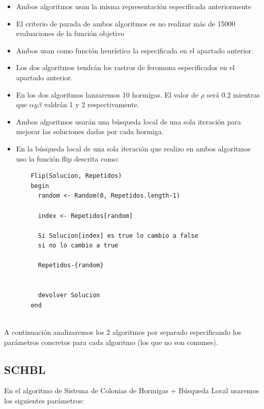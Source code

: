 \begin{itemize}
	\item Ambos algoritmos usan la misma representación especificada anteriormente

	\item El criterio de parada de ambos algoritmos es no realizar más de 15000 evaluaciones de la función objetivo
	
	\item Ambos usan como función heurística la especificada en el apartado anterior.
	
	\item Los dos algoritmos tendrán los rastros de feromona especificados en el apartado anterior.
	
	\item En los dos algoritmos lanzaremos 10 hormigas. El valor de $\rho$ será 0.2 mientras que $\alpha y \beta$ valdrán 1 y 2 respectivamente.
	
	\item Ambos algoritmos usarán una búsqueda local de una sola iteración para mejorar las soluciones dadas por cada hormiga.
	
	\item En la búsqueda local de una sola iteración que realizo en ambos algoritmos uso la función flip descrita como:
	
	\begin{lstlisting}
	Flip(Solucion, Repetidos)
	begin
	  random <- Random(0, Repetidos.length-1)
	
	  index <- Repetidos[random]
	
	  Si Solucion[index] es true lo cambio a false
	  si no lo cambio a true
	
	  Repetidos-{random}
	
	
	  devolver Solucion
	end
	
	\end{lstlisting}		  			
\end{itemize}


A continuación analizaremos los 2 algoritmos por separado especificando los parámetros concretos para cada algoritmo (los que no son comunes).

\subsection{SCHBL}
En el algoritmo de Sistema de Colonias de Hormigas + Búsqueda Local usaremos los siguientes parámetros:

